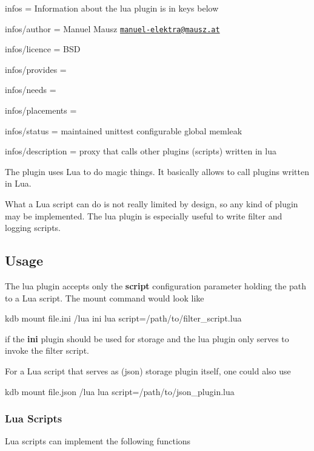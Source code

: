 
\begin{DoxyItemize}
\item infos = Information about the lua plugin is in keys below
\item infos/author = Manuel Mausz \href{mailto:manuel-elektra@mausz.at}{\tt manuel-\/elektra@mausz.\+at}
\item infos/licence = B\+S\+D
\item infos/provides =
\item infos/needs =
\item infos/placements =
\item infos/status = maintained unittest configurable global memleak
\item infos/description = proxy that calls other plugins (scripts) written in lua
\end{DoxyItemize}

The plugin uses Lua to do magic things. It basically allows to call plugins written in Lua.

What a Lua script can do is not really limited by design, so any kind of plugin may be implemented. The lua plugin is especially useful to write filter and logging scripts.

\subsection*{Usage}

The lua plugin accepts only the {\bfseries script} configuration parameter holding the path to a Lua script. The mount command would look like \begin{DoxyVerb}kdb mount file.ini /lua ini lua script=/path/to/filter_script.lua
\end{DoxyVerb}


if the {\bfseries ini} plugin should be used for storage and the lua plugin only serves to invoke the filter script.

For a Lua script that serves as (json) storage plugin itself, one could also use \begin{DoxyVerb}kdb mount file.json /lua lua script=/path/to/json_plugin.lua
\end{DoxyVerb}


\subsubsection*{Lua Scripts}

Lua scripts can implement the following functions


